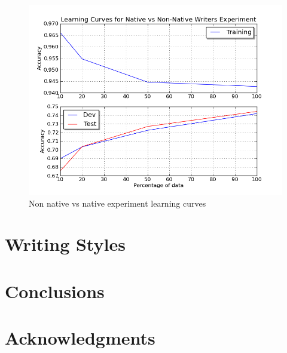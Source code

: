 \documentclass[11pt]{article}
\begin{document}
\begin{figure}[htp]
\centering
\includegraphics[scale=0.45]{native_lc.png}
\caption{Non native vs native experiment learning curves}
\label{non_lc}
\end{figure}

\section{Writing Styles}


\section{Conclusions}

\section*{Acknowledgments}
\end{document}
